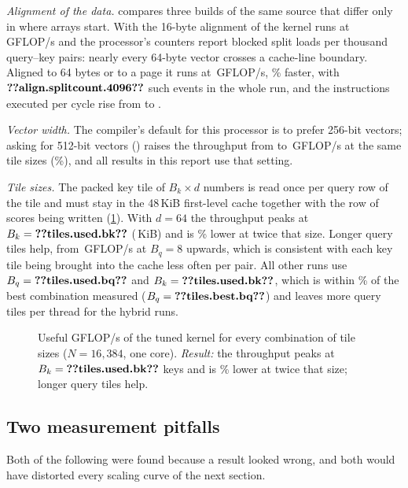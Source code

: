 \emph{Alignment of the data.}  compares three builds of the same
source that differ only in where arrays start. With the 16-byte alignment of
 the kernel runs at \,GFLOP/s and the processor's
counters report  blocked split loads per thousand query--key
pairs: nearly every 64-byte vector crosses a cache-line boundary. Aligned to 64
bytes or to a page it runs at \,GFLOP/s, \%
faster, with $\n{align.splitcount.4096}$ such events in the whole run, and the
instructions executed per cycle rise from  to .


\emph{Vector width.} The compiler's default for this processor is to prefer
256-bit vectors; asking for 512-bit vectors ()
raises the throughput from  to \,GFLOP/s
at the same tile sizes (\%), and all results in this report
use that setting.

\emph{Tile sizes.} The packed key tile of $B_k\times d$ numbers is read once per
query row of the tile and must stay in the 48\,KiB first-level cache together with
the row of scores being written (\cref{fig:tiles}). With $d=64$ the throughput
peaks at $B_k=\n{tiles.used.bk}$ (\,KiB) and is
\% lower at twice that size. Longer query tiles help, from
\,GFLOP/s at $B_q=8$ upwards, which is consistent with each key
tile being brought into the cache less often per pair. All other runs use
$B_q=\n{tiles.used.bq}$ and $B_k=\n{tiles.used.bk}$, which is within
\% of the best combination measured
($B_q=\n{tiles.best.bq}$) and leaves more query tiles per thread for the hybrid
runs.

\begin{figure}[t]
\centering
{}
\caption{Useful GFLOP/s of the tuned kernel for every combination of tile sizes
($N=16{,}384$, one core). \emph{Result:} the throughput peaks at
$B_k=\n{tiles.used.bk}$ keys and is \% lower at twice that size;
longer query tiles help.}
\label{fig:tiles}
\end{figure}

\subsection{Two measurement pitfalls}\label{sec:pitfalls}
Both of the following were found because a result looked wrong, and both would have
distorted every scaling curve of the next section.

